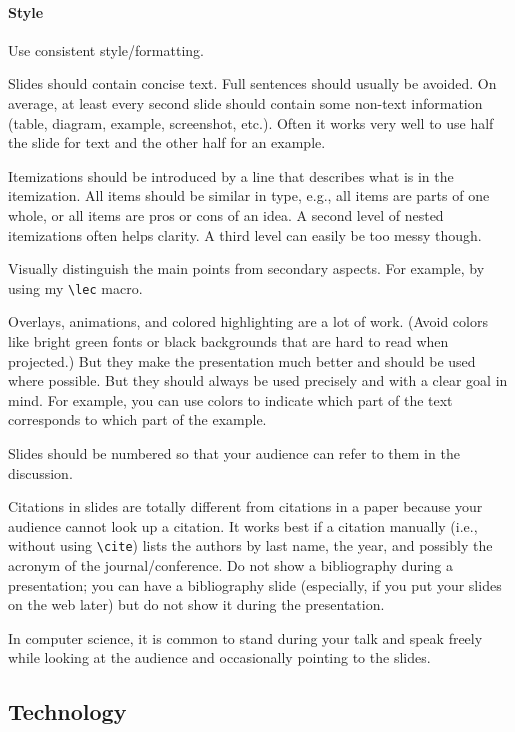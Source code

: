 \documentclass[12pt]{article}
\begin{document}
\paragraph{Style}
Use consistent style/formatting.
\medskip

Slides should contain concise text.
Full sentences should usually be avoided.
On average, at least every second slide should contain some non-text information (table, diagram, example, screenshot, etc.).
Often it works very well to use half the slide for text and the other half for an example.
\medskip

Itemizations should be introduced by a line that describes what is in the itemization.
All items should be similar in type, e.g., all items are parts of one whole, or all items are pros or cons of an idea.
A second level of nested itemizations often helps clarity.
A third level can easily be too messy though.
\medskip

Visually distinguish the main points from secondary aspects. For example, by using my \verb|\lec| macro.
\medskip

Overlays, animations, and colored highlighting are a lot of work.
(Avoid colors like bright green fonts or black backgrounds that are hard to read when projected.)
But they make the presentation much better and should be used where possible.
But they should always be used precisely and with a clear goal in mind.
For example, you can use colors to indicate which part of the text corresponds to which part of the example. 
\medskip

Slides should be numbered so that your audience can refer to them in the discussion.
\medskip

Citations in slides are totally different from citations in a paper because your audience cannot look up a citation.
It works best if a citation manually (i.e., without using \verb|\cite|) lists the authors by last name, the year, and possibly the acronym of the journal/conference.
Do not show a bibliography during a presentation; you can have a bibliography slide (especially, if you put your slides on the web later) but do not show it during the presentation.
\medskip

In computer science, it is common to stand during your talk and speak freely while looking at the audience and occasionally pointing to the slides.
\medskip

\subsection{Technology}
\end{document}
